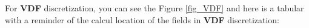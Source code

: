 
For \textbf{VDF} discretization, you can see the Figure \ref{fig_VDF} and here is a tabular with a reminder of the calcul location of the fields in \textbf{VDF} discretization:


